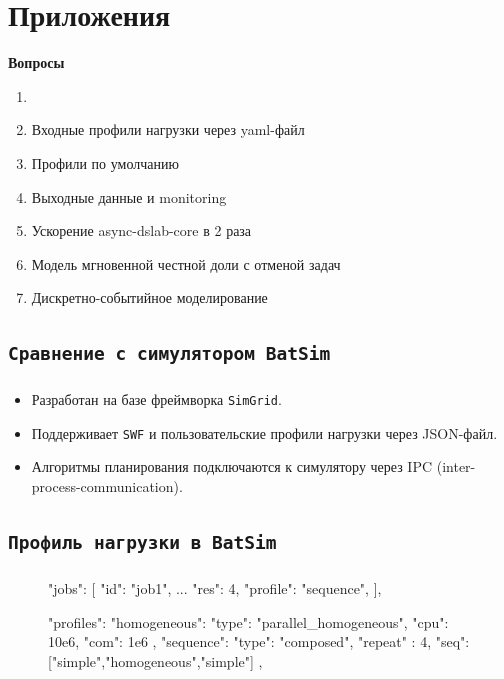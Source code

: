\documentclass[t]{beamer}  %
\begin{document}
	\section{Приложения}
	
	\begin{frame}{\textbf{Вопросы}}
	
		\begin{enumerate}
			\item \hyperlink{batsim-compare}{}
			\item Входные профили нагрузки через yaml-файл 
			\item Профили по умолчанию 
			\item Выходные данные и monitoring 
			\item Ускорение async-dslab-core в 2 раза
			\item Модель мгновенной честной доли с отменой задач 
			\item Дискретно-событийное моделирование 
		\end{enumerate}
	\end{frame}

	\subsection{\texttt{Сравнение с симулятором \texttt{BatSim}}}\label{batsim-compare}

	\begin{frame}[fragile]
		\frametitle{\insertsection} 
		\framesubtitle{\insertsubsection}
		\vspace{1cm}	
		\begin{itemize}
			\item Разработан на базе фреймворка \texttt{SimGrid}.
			\item Поддерживает \texttt{SWF} и пользовательские профили нагрузки через JSON-файл.
			\item Алгоритмы планирования подключаются к симулятору через IPC (inter-process-communication).
		\end{itemize}
		\end{frame}


	\subsection{\texttt{Профиль нагрузки в BatSim}}
	\begin{frame}[fragile]
		\frametitle{\insertsection} 
		\framesubtitle{\insertsubsection}
		\begin{figure}
			\scriptsize
		\begin{jsoncode}
"jobs": [
  {"id": "job1",  ...  "res": 4, "profile": "sequence"},
],

"profiles": {
  "homogeneous": {
    "type": "parallel_homogeneous",
    "cpu": 10e6,
    "com": 1e6
  },
  "sequence": {
    "type": "composed",
    "repeat" : 4,
    "seq": ["simple","homogeneous","simple"]
  },
}
		\end{jsoncode}
	\end{figure}
	\end{frame}
\end{document}
